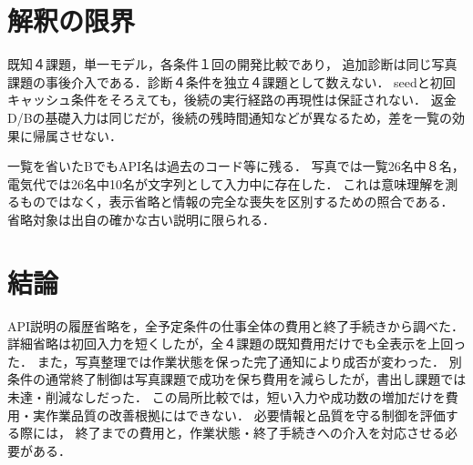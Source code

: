\documentclass[uplatex,a4paper,twocolumn,10pt]{jsarticle}
\begin{document}
\section{解釈の限界}
既知４課題，単一モデル，各条件１回の開発比較であり，
追加診断は同じ写真課題の事後介入である．診断４条件を独立４課題として数えない．
seedと初回キャッシュ条件をそろえても，後続の実行経路の再現性は保証されない．
返金D/Bの基礎入力は同じだが，後続の残時間通知などが異なるため，差を一覧の効果に帰属させない．
\InventoryVariation

一覧を省いたBでもAPI名は過去のコード等に残る．
写真では一覧26名中８名，電気代では26名中10名が文字列として入力中に存在した．
これは意味理解を測るものではなく，表示省略と情報の完全な喪失を区別するための照合である．
省略対象は出自の確かな古い説明に限られる．

\section{結論}
API説明の履歴省略を，全予定条件の仕事全体の費用と終了手続きから調べた．
詳細省略は初回入力を短くしたが，全４課題の既知費用だけでも全表示を上回った．
また，写真整理では作業状態を保った完了通知により成否が変わった．
別条件の通常終了制御は写真課題で成功を保ち費用を減らしたが，書出し課題では未達・削減なしだった．
この局所比較では，短い入力や成功数の増加だけを費用・実作業品質の改善根拠にはできない．
必要情報と品質を守る制御を評価する際には，
終了までの費用と，作業状態・終了手続きへの介入を対応させる必要がある．
\end{document}
